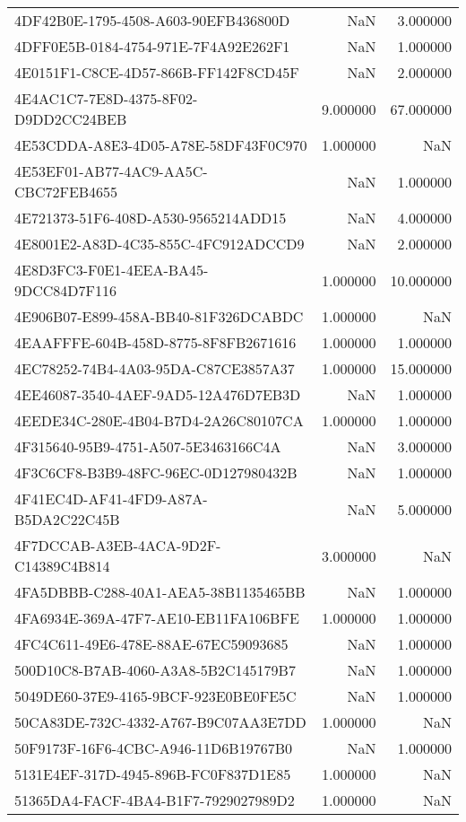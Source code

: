 \begin{tabular}{lrr}
4DF42B0E-1795-4508-A603-90EFB436800D & NaN & 3.000000 \\
4DFF0E5B-0184-4754-971E-7F4A92E262F1 & NaN & 1.000000 \\
4E0151F1-C8CE-4D57-866B-FF142F8CD45F & NaN & 2.000000 \\
4E4AC1C7-7E8D-4375-8F02-D9DD2CC24BEB & 9.000000 & 67.000000 \\
4E53CDDA-A8E3-4D05-A78E-58DF43F0C970 & 1.000000 & NaN \\
4E53EF01-AB77-4AC9-AA5C-CBC72FEB4655 & NaN & 1.000000 \\
4E721373-51F6-408D-A530-9565214ADD15 & NaN & 4.000000 \\
4E8001E2-A83D-4C35-855C-4FC912ADCCD9 & NaN & 2.000000 \\
4E8D3FC3-F0E1-4EEA-BA45-9DCC84D7F116 & 1.000000 & 10.000000 \\
4E906B07-E899-458A-BB40-81F326DCABDC & 1.000000 & NaN \\
4EAAFFFE-604B-458D-8775-8F8FB2671616 & 1.000000 & 1.000000 \\
4EC78252-74B4-4A03-95DA-C87CE3857A37 & 1.000000 & 15.000000 \\
4EE46087-3540-4AEF-9AD5-12A476D7EB3D & NaN & 1.000000 \\
4EEDE34C-280E-4B04-B7D4-2A26C80107CA & 1.000000 & 1.000000 \\
4F315640-95B9-4751-A507-5E3463166C4A & NaN & 3.000000 \\
4F3C6CF8-B3B9-48FC-96EC-0D127980432B & NaN & 1.000000 \\
4F41EC4D-AF41-4FD9-A87A-B5DA2C22C45B & NaN & 5.000000 \\
4F7DCCAB-A3EB-4ACA-9D2F-C14389C4B814 & 3.000000 & NaN \\
4FA5DBBB-C288-40A1-AEA5-38B1135465BB & NaN & 1.000000 \\
4FA6934E-369A-47F7-AE10-EB11FA106BFE & 1.000000 & 1.000000 \\
4FC4C611-49E6-478E-88AE-67EC59093685 & NaN & 1.000000 \\
500D10C8-B7AB-4060-A3A8-5B2C145179B7 & NaN & 1.000000 \\
5049DE60-37E9-4165-9BCF-923E0BE0FE5C & NaN & 1.000000 \\
50CA83DE-732C-4332-A767-B9C07AA3E7DD & 1.000000 & NaN \\
50F9173F-16F6-4CBC-A946-11D6B19767B0 & NaN & 1.000000 \\
5131E4EF-317D-4945-896B-FC0F837D1E85 & 1.000000 & NaN \\
51365DA4-FACF-4BA4-B1F7-7929027989D2 & 1.000000 & NaN \\

\end{tabular}
